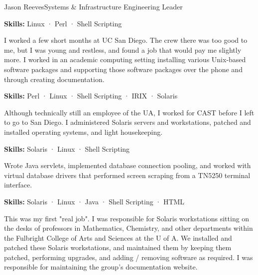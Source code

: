 \documentclass{article}
\begin{document}
\begin{cv}{Jason Reeves}{Systems \& Infrastructure Engineering Leader}
\begin{cvevent}[Mar 2000][May 2000]
  \textbf{Skills:} Linux · Perl · Shell Scripting
  \vspace*{5mm}
\end{cvevent}

\begin{cvevent}[Nov 1999][Mar 2000]
  I worked a few short months at UC San Diego. The crew there was too good to me, but I was young and restless, and found a job that would pay me slightly more. I worked in an academic computing setting installing various Unix-based software packages and supporting those software packages over the phone and through creating documentation.
  \vspace*{3mm}
  
  \textbf{Skills:} Perl · Linux · Shell Scripting · IRIX · Solaris
  \vspace*{5mm}
\end{cvevent}

\begin{cvevent}[Jan 1998][Nov 1999]
  Although technically still an employee of the UA, I worked for CAST before I left to go to San Diego. I administered Solaris servers and workstations, patched and installed operating systems, and light housekeeping.
  \vspace*{3mm}
  
  \textbf{Skills:} Solaris · Linux · Shell Scripting
  \vspace*{5mm}
\end{cvevent}

\begin{cvevent}[Jan 1997][Nov 1998]
  Wrote Java servlets, implemented database connection pooling, and worked with virtual database drivers that performed screen scraping from a TN5250 terminal interface.
  \vspace*{3mm}
  
  \textbf{Skills:} Solaris · Linux · Java · Shell Scripting · HTML
  \vspace*{5mm}
\end{cvevent}

\begin{cvevent}[Nov 1995][Jan 1997]
  This was my first "real job". I was responsible for Solaris workstations sitting on the desks of professors in Mathematics, Chemistry, and other departments within the Fulbright College of Arts and Sciences at the U of A. We installed and patched these Solaris workstations, and maintained them by keeping them patched, performing upgrades, and adding / removing software as required. I was responsible for maintaining the group's documentation website.
  \vspace*{3mm}
  

\end{cvevent}
\end{cv}
\end{document}
